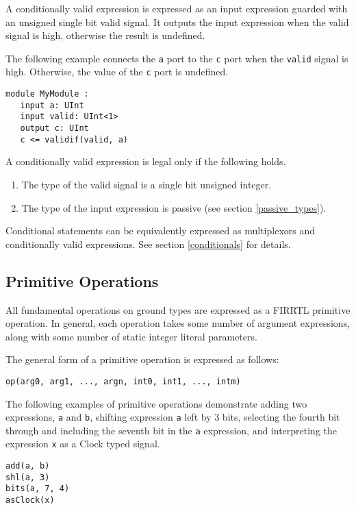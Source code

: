 \documentclass[12pt]{article}
\begin{document}
A conditionally valid expression is expressed as an input expression guarded with an unsigned single bit valid signal. It outputs the input expression when the valid signal is high, otherwise the result is undefined.

The following example connects the \verb|a| port to the \verb|c| port when the \verb|valid| signal is high. Otherwise, the value of the \verb|c| port is undefined.
\begin{verbatim}
module MyModule :
   input a: UInt
   input valid: UInt<1>   
   output c: UInt
   c <= validif(valid, a)
\end{verbatim}

A conditionally valid expression is legal only if the following holds.
\begin{enumerate}
\item The type of the valid signal is a single bit unsigned integer.
\item The type of the input expression is passive (see section \ref{passive_types}).
\end{enumerate}

Conditional statements can be equivalently expressed as multiplexors and conditionally valid expressions. See section \ref{conditionals} for details.

\subsection{Primitive Operations}

All fundamental operations on ground types are expressed as a FIRRTL primitive operation. In general, each operation takes some number of argument expressions, along with some number of static integer literal parameters. 

The general form of a primitive operation is expressed as follows:
\begin{verbatim}
op(arg0, arg1, ..., argn, int0, int1, ..., intm)
\end{verbatim}

The following examples of primitive operations demonstrate adding two expressions, \verb|a| and \verb|b|, shifting expression \verb|a| left by 3 bits, selecting the fourth bit through and including the seventh bit in the \verb|a| expression, and interpreting the expression \verb|x| as a Clock typed signal.
\begin{verbatim}
add(a, b)
shl(a, 3)
bits(a, 7, 4)
asClock(x)
\end{verbatim}
\end{document}
